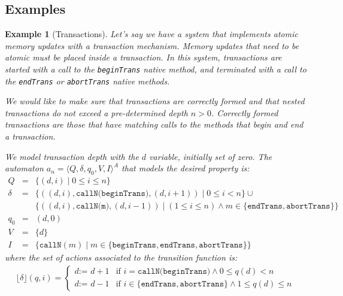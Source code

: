 \documentclass[10pt,notitlepage,twoside]{article}
\newcommand{\aut}{a}
\newcommand{\automata}[5]{\langle #1,#2,#3,#4,#5 \rangle^A}
\newcommand{\theautomaton}{\automata{Q}{\delta}{q_0}{V}{I}}
\newcommand{\floor}[1]{\lfloor #1 \rfloor}
\newtheorem{example}{Example}
\begin{document}
\subsection{Examples}

\begin{example}[Transactions]   
Let's say we have a system that implements atomic memory updates with a transaction mechanism. Memory updates that need to be atomic must be placed inside a transaction. In this system, transactions are started with a call to the \texttt{beginTrans} native method, and terminated with a call to the \texttt{endTrans}  or \texttt{abortTrans} native methods.

We would like to make sure that transactions are correctly formed and that nested transactions do not exceed a pre-determined depth $n > 0$. Correctly formed transactions are those that have matching calls to the methods that begin and end a transaction.

We model transaction depth with the $d$ variable, initially set of zero. The automaton $\aut_n = \theautomaton$ that models the desired property is:
\begin{displaymath}
\begin{array}{rcl}
Q & = &  \{ (d,i) \mid 0 \leq i \leq n  \}  \\
\delta & = &  \{ ((d,i),\texttt{callN(beginTrans)},(d,i+1)) \mid 0 \leq i < n \} \cup \\
& & \{ ((d,i),\texttt{callN(m)},(d,i-1)) \mid (1 \leq i \leq n) \wedge m \in \{\texttt{endTrans},\texttt{abortTrans}   \} \}    \\
q_0 & = & (d,0) \\
V & = & \{ d \} \\
I & = & \{ \texttt{callN}(m) \mid m \in \{ \texttt{beginTrans}, \texttt{endTrans}, \texttt{abortTrans} \}  \}
\end{array}
\end{displaymath}
where the set of actions associated to the transition function is:
\begin{displaymath}
\begin{array}{l}
\floor{\delta}(q,i) = \left \{ \begin{array}{ll}
d \texttt{:= } d + 1 & \mbox{if } i = \texttt{callN(beginTrans)} \wedge 0 \leq q(d) < n \\
d \texttt{:= } d - 1 & \mbox{if } i \in  \{\texttt{endTrans},\texttt{abortTrans}   \} \wedge 1 \leq q(d) \leq n
\end{array} \right . \\
\end{array}
\end{displaymath}

\end{example}
\end{document}
